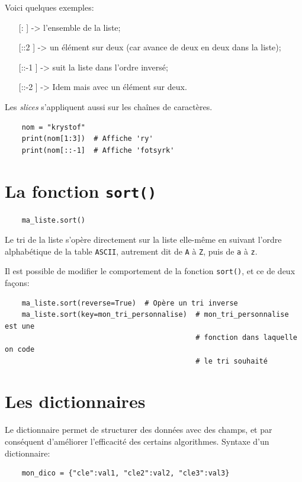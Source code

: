 \documentclass[a4paper,12pt]{book}
\begin{document}
Voici quelques exemples:
\begin{itemize}
	\item[[:]] -> l'ensemble de la liste;
	\item[[::2]] -> un élément sur deux (car avance de deux en deux dans la liste);
	\item[[::-1]] -> suit la liste dans l'ordre inversé;
	\item[[::-2]] -> Idem mais avec un élément sur deux.
\end{itemize}
\medskip

Les \textit{slices} s'appliquent aussi sur les chaînes de caractères.
\begin{verbatim}
    nom = "krystof"
    print(nom[1:3])  # Affiche 'ry'
    print(nom[::-1]  # Affiche 'fotsyrk'
\end{verbatim}
\medskip

\section{La fonction \texttt{sort()}}
\begin{verbatim}
    ma_liste.sort()
\end{verbatim}
\medskip

Le tri de la liste s'opère directement sur la liste elle-même en suivant l'ordre alphabétique de la table \texttt{ASCII}, autrement dit de \texttt{A} à \texttt{Z}, puis de \texttt{a} à \texttt{z}.
\medskip

Il est possible de modifier le comportement de la fonction \texttt{sort()}, et ce de deux façons:
\begin{verbatim}
    ma_liste.sort(reverse=True)  # Opère un tri inverse
    ma_liste.sort(key=mon_tri_personnalise)  # mon_tri_personnalise est une 
                                             # fonction dans laquelle on code 
                                             # le tri souhaité
\end{verbatim}
\medskip

\section{Les dictionnaires}\label{les_dictionnaires}
Le dictionnaire permet de structurer des données avec des champs, et par conséquent d'améliorer l'efficacité des certains algorithmes. Syntaxe d'un dictionnaire:
\begin{verbatim}
    mon_dico = {"cle":val1, "cle2":val2, "cle3":val3}
\end{verbatim}
\medskip
\end{document}
